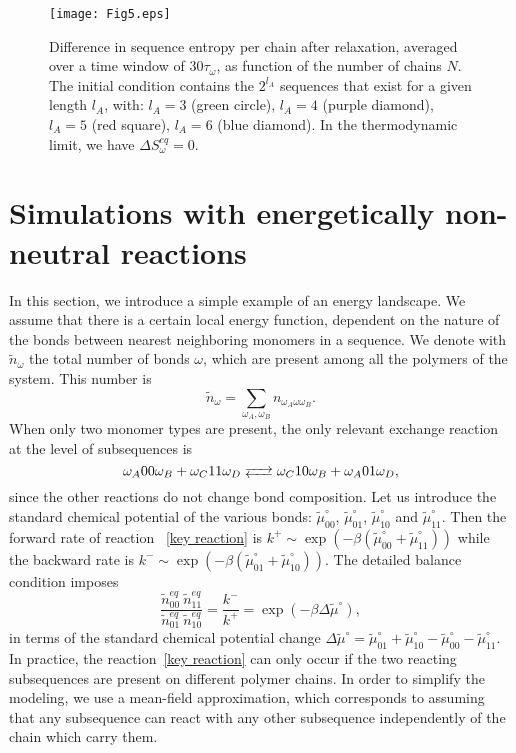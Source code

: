 \documentclass[
	amsmath,
	amssymb,
	a4paper,
	aip,		%
	jcp,		%
	reprint, twocolumn  %
	fleqn,
	showpacs,
	floatfix
]{revtex4-1}
\newcommand{\be}{\begin{equation}}
\newcommand{\ee}{\end{equation}}
\begin{document}
\begin{figure}[H]
\centering
\texttt{[image: Fig5.eps]} 
\caption{Difference in sequence entropy per chain after relaxation, averaged over a time window of $30 \tau_{\omega}$, as function of the 
number of chains $N$. The initial condition contains the $2^{l_A}$ sequences that exist for a given length $l_A$, with: 
$l_A=3$ (green circle), $l_A=4$ (purple diamond), $l_A=5$ (red square), $l_A=6$ (blue diamond). 
In the thermodynamic limit, we have $\Delta S^{eq}_{\omega} = 0$.}
\label{Effetfrigo}
\end{figure}





\section{Simulations with energetically non-neutral reactions}
\label{sec:simul_non_neutral}
In this section, we introduce a simple example of an energy landscape. We assume that  
there is a certain local energy function, dependent on the nature of the bonds between nearest neighboring monomers 
in a sequence. 
We denote with $\tilde{n}_\omega$ the total number of bonds $\omega$, which are present among all the polymers of the system.
This number is
\be
\tilde{n}_\omega=\sum_{\omega_A,\omega_B} n_{\omega_A \omega \omega_B}.
\label{Seqdefin}
\ee
When only two monomer types are present, 
the only relevant exchange reaction at the level of subsequences is
\be
\omega_{A}00\omega_{B} + \omega_{C}11\omega_{D} \ce{<-->} \omega_{C}10\omega_{B} + \omega_{A}01\omega_{D},
\label{key reaction} 
\ee 
since the other reactions do not change bond composition.
Let us introduce the standard chemical potential of the various bonds: $\tilde{\mu}^\circ_{00}$, $\tilde{\mu}^\circ_{01}$, 
$\tilde{\mu}^\circ_{10}$ and $\tilde{\mu}^\circ_{11}$. 
Then the forward rate of reaction ~\eqref{key reaction} is 
$k^+ \sim \exp \left( -\beta (\tilde{\mu}^\circ_{00} + \tilde{\mu}^\circ_{11}) \right)$ while the backward rate is 
$k^- \sim \exp \left( - \beta (\tilde{\mu}^\circ_{01} + \tilde{\mu}^\circ_{10}) \right)$.
The detailed balance condition imposes
\begin{equation}
\frac{\tilde{n}_{00}^{eq} \ \tilde{n}_{11}^{eq}}{\tilde{n}_{01}^{eq} \ \tilde{n}_{10}^{eq}}=\frac{k^-}{k^+}=
\exp{\left( -\beta \Delta \tilde{\mu}^\circ \right)},
\label{detbalbond}
\end{equation}
in terms of the standard chemical potential change $\Delta \tilde{\mu}^\circ= \tilde{\mu}^\circ_{01} + \tilde{\mu}^\circ_{10} -
\tilde{\mu}^\circ_{00} - \tilde{\mu}^\circ_{11}$.
In practice, the reaction~\eqref{key reaction} can only occur if the two reacting subsequences are present on different polymer chains.
In order to simplify the modeling, we use a mean-field approximation, which corresponds to assuming that any subsequence 
can react with any other subsequence independently of the chain which carry them.
\end{document}
